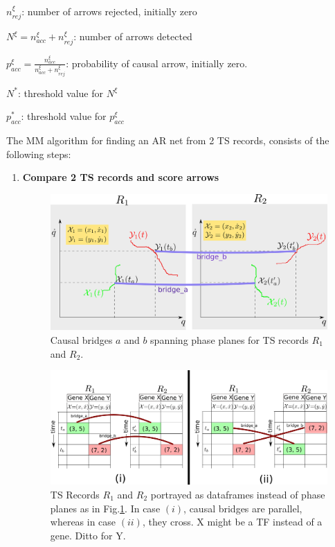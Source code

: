 \documentclass[12pt]{article}
\begin{document}
$n_{rej}^{\xi}$: number of arrows rejected, initially zero

$N^{\xi}=n_{acc}^\xi+ n_{rej}^\xi$: number of arrows detected

$p_{acc}^{\xi}=\frac{n_{acc}^{\xi}}
{n_{acc}^{\xi}+n_{rej}^{\xi}}$: probability of causal arrow, initially zero.

$N^*$: threshold value for
$N^\xi$

$p_{acc}^*$: threshold value for 
$p_{acc}^\xi$

The MM algorithm 
for finding an AR net
from 2 TS records, consists of the following steps:
\begin{enumerate}
\item {\bf Compare 2 TS records
and score arrows}

\begin{figure}[h!]
\centering
\includegraphics[width=5in]
{two-phase-plane-bridges.png}
\caption{Causal bridges $a$ and $b$ spanning
	phase planes for
TS records $R_1$ and $R_2$.}
\label{fig-two-phase-plane-bridges}
\end{figure}
\begin{figure}[h!]
\centering
\includegraphics[width=6in]
{two-dataframes.png}
\caption{TS Records $R_1$ and $R_2$ portrayed
as dataframes instead of phase planes
as in Fig.\ref{fig-two-phase-plane-bridges}.
In case  $(i)$, causal bridges are 
parallel, whereas in case $(ii)$, they 
cross. X might be a TF instead of a gene.
Ditto for Y.}
\label{fig-two-dataframes}
\end{figure}


\end{enumerate}
\end{document}
